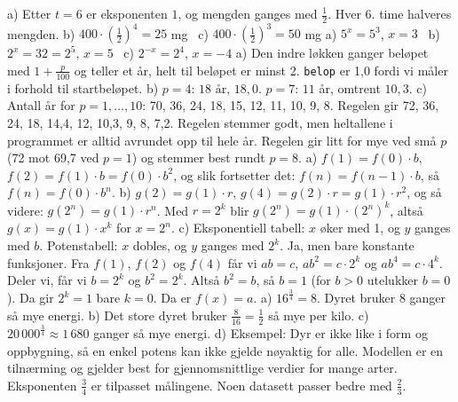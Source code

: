  a) Etter $t = 6$ er eksponenten $1$, og mengden ganges med $\frac12$. Hver 6. time halveres mengden.
b) $400 \cdot \left(\frac12\right)^4 = 25$ mg \ c) $400 \cdot \left(\frac12\right)^3 = 50$ mg
 a) $5^x = 5^3$, $x = 3$ \ b) $2^x = 32 = 2^5$, $x = 5$ \ c) $2^{-x} = 2^4$, $x = -4$
 a) Den indre løkken ganger beløpet med $1 + \frac{p}{100}$ og teller et år, helt til beløpet er minst 2. \texttt{belop} er 1,0 fordi vi måler i forhold til startbeløpet.
b) $p = 4$: $18$ år, $18{,}0$. $p = 7$: $11$ år, omtrent $10{,}3$.
c) Antall år for $p = 1, \ldots, 10$: 70, 36, 24, 18, 15, 12, 11, 10, 9, 8. Regelen gir 72, 36, 24, 18, 14,4, 12, 10,3, 9, 8, 7,2. Regelen stemmer godt, men heltallene i programmet er alltid avrundet opp til hele år. Regelen gir litt for mye ved små $p$ (72 mot 69,7 ved $p = 1$) og stemmer best rundt $p = 8$.
 a) $f(1) = f(0) \cdot b$, $f(2) = f(1) \cdot b = f(0) \cdot b^2$, og slik fortsetter det: $f(n) = f(n-1) \cdot b$, så $f(n) = f(0) \cdot b^n$.
b) $g(2) = g(1) \cdot r$, $g(4) = g(2) \cdot r = g(1) \cdot r^2$, og så videre: $g(2^n) = g(1) \cdot r^n$. Med $r = 2^k$ blir $g(2^n) = g(1) \cdot (2^n)^k$, altså $g(x) = g(1) \cdot x^k$ for $x = 2^n$.
c) Eksponentiell tabell: $x$ øker med 1, og $y$ ganges med $b$. Potenstabell: $x$ dobles, og $y$ ganges med $2^k$.
 Ja, men bare konstante funksjoner. Fra $f(1)$, $f(2)$ og $f(4)$ får vi $ab = c$, $ab^2 = c \cdot 2^k$ og $ab^4 = c \cdot 4^k$. Deler vi, får vi $b = 2^k$ og $b^2 = 2^k$. Altså $b^2 = b$, så $b = 1$ (for $b > 0$ utelukker $b = 0$). Da gir $2^k = 1$ bare $k = 0$. Da er $f(x) = a$.
 a) $16^{\tfrac34} = 8$. Dyret bruker 8 ganger så mye energi.
b) Det store dyret bruker $\frac{8}{16} = \frac12$ så mye per kilo.
c) $20\,000^{\tfrac34} \approx 1\,680$ ganger så mye energi.
d) Eksempel: Dyr er ikke like i form og oppbygning, så en enkel potens kan ikke gjelde nøyaktig for alle. Modellen er en tilnærming og gjelder best for gjennomsnittlige verdier for mange arter. Eksponenten $\tfrac34$ er tilpasset målingene. Noen datasett passer bedre med $\tfrac23$.
